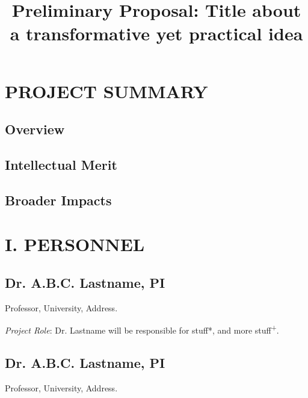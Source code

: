 \documentclass[10pt,letterpaper]{article}
\title{ \textbf{Preliminary Proposal: Title about a transformative yet practical idea } }
\date{}
\begin{document}
\maketitle
\thispagestyle{empty}
\pagestyle{plain}




\section*{PROJECT SUMMARY} 

\subsection*{Overview} 

\blindtext

\blindtext

\subsection*{Intellectual Merit}

\blindtext

\blindtext

\subsection*{Broader Impacts}

\blindtext


\newpage

\setcounter{page}{1}

\pagestyle{myheadings}



\section*{I. PERSONNEL}

\vspace{5mm}

\subsection*{Dr. A.B.C. Lastname, PI}
\noindent Professor, University, Address.

\emph{Project Role}: Dr. Lastname will be responsible for stuff*, and more stuff\textsuperscript{+}.


\subsection*{Dr. A.B.C. Lastname, PI}
\noindent Professor, University, Address.
\end{document}
